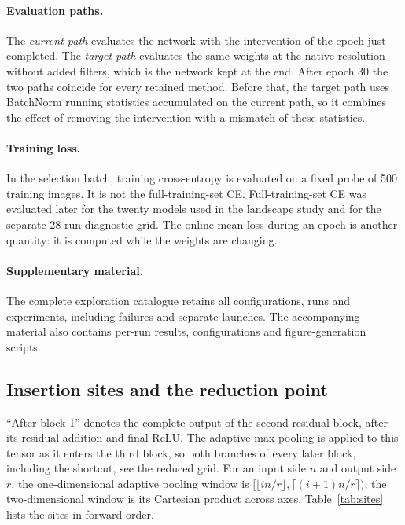 \paragraph{Evaluation paths.} The \emph{current path} evaluates the network with the intervention of the epoch just completed. The \emph{target path} evaluates the same weights at the native resolution without added filters, which is the network kept at the end. After epoch 30 the two paths coincide for every retained method. Before that, the target path uses BatchNorm running statistics accumulated on the current path, so it combines the effect of removing the intervention with a mismatch of these statistics.

\paragraph{Training loss.} In the selection batch, training cross-entropy is evaluated on a fixed probe of 500 training images. It is not the full-training-set CE. Full-training-set CE was evaluated later for the twenty models used in the landscape study and for the separate 28-run diagnostic grid. The online mean loss during an epoch is another quantity: it is computed while the weights are changing.

\paragraph{Supplementary material.}
\label{app:catalogue}
The complete exploration catalogue retains all \idxConfigurations{} configurations, \idxRuns{} runs and \idxExperiments{} experiments, including failures and separate launches. The accompanying material also contains per-run results, configurations and figure-generation scripts.

\subsection{Insertion sites and the reduction point}
\label{app:sites}
``After block 1'' denotes the complete output of the second residual block, after its residual addition and final ReLU. The adaptive max-pooling is applied to this tensor as it enters the third block, so both branches of every later block, including the shortcut, see the reduced grid. For an input side $n$ and output side $r$, the one-dimensional adaptive pooling window is $[\lfloor in/r\rfloor,\lceil(i+1)n/r\rceil)$; the two-dimensional window is its Cartesian product across axes. Table~\ref{tab:sites} lists the sites in forward order.

